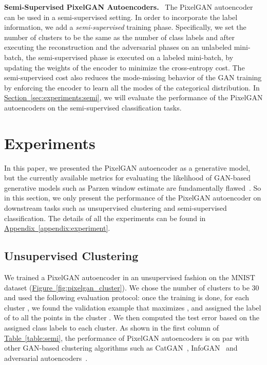 \documentclass{article}
\newcommand{\mysec}[1]{\hyperref[sec:#1]{Section~\ref*{sec:#1}}}
\newcommand{\mytable}[1]{\hyperref[table:#1]{Table~\ref*{table:#1}}}
\newcommand{\myfig}[1]{\hyperref[fig:#1]{Figure~\ref*{fig:#1}}}
\newcommand{\myappendix}[1]{\hyperref[appendix:#1]{Appendix~\ref*{appendix:#1}}}
\DeclareRobustCommand{\parhead}[1]{\textbf{#1}~}
\begin{document}
\parhead{Semi-Supervised PixelGAN Autoencoders.} The PixelGAN autoencoder can be used in a semi-supervised setting. In order to incorporate the label information, we add a \emph{semi-supervised} training phase. Specifically, we set the number of clusters to be the same as the number of class labels and after executing the reconstruction and the adversarial phases on an unlabeled mini-batch, the semi-supervised phase is executed on a labeled mini-batch, by updating the weights of the encoder  to minimize the cross-entropy cost. The semi-supervised cost also reduces the mode-missing behavior of the GAN training by enforcing the encoder to learn all the modes of the categorical distribution. In \mysec{experiments:semi}, we will evaluate the performance of the PixelGAN autoencoders on the semi-supervised classification tasks.


\section{Experiments}\label{sec:experiments}



In this paper, we presented the PixelGAN autoencoder as a generative model, but the currently available metrics for evaluating the likelihood of GAN-based generative models such as Parzen window estimate are fundamentally flawed~\citep{theis}. So in this section, we only present the performance of the PixelGAN autoencoder on downstream tasks such as unsupervised clustering and semi-supervised classification. The details of all the experiments can be found in \myappendix{experiment}.

\subsection{Unsupervised Clustering}\label{sec:experiments:unsup}
We trained a PixelGAN autoencoder in an unsupervised fashion on the MNIST dataset (\myfig{pixelgan_cluster}). We chose the number of clusters to be 30 and used the following evaluation protocol: once the training is done, for each cluster , we found the validation example  that maximizes , and assigned the label of  to all the points in the cluster . We then computed the test error based on the assigned class labels to each cluster. As shown in the first column of \mytable{semi}, the performance of PixelGAN autoencoders is on par with other GAN-based clustering algorithms such as CatGAN~\citep{catgan}, InfoGAN~\citep{infogan} and adversarial autoencoders~\citep{aae}.
\end{document}

